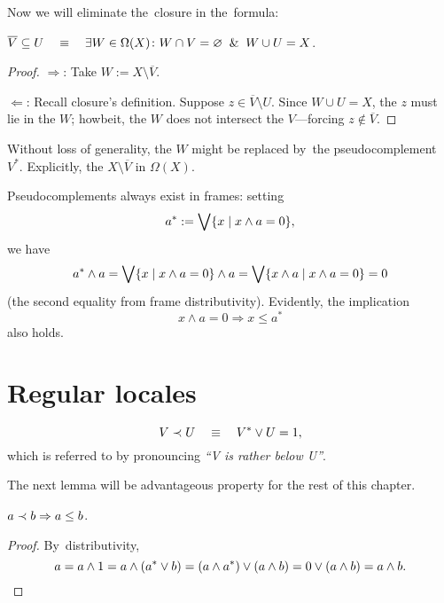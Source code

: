 Now we will eliminate the~closure in the~formula:

\begin{lem}
  $\overline{V}\subseteq U \quad \equiv \quad \exists W\in \Omega(X)\colon W \cap V =
  \varnothing \;\; \& \;\; W \cup U = X$.
\end{lem}
\begin{proof}
  $\Rightarrow$:
  Take $W := X\setminus \overline{V}$.

  $\Leftarrow$:
  Recall closure's definition.
  Suppose $z\in \overline{V}\setminus U$.
  Since $W \cup U = X$, the $z$ must lie in the $W$;
  howbeit, the $W$ does not intersect the $V$---forcing $z\not\in
  \overline{V}$.
\end{proof}

Without loss of generality, the $W$ might be replaced by~the
pseudocomplement~$V^*$.
Explicitly, the $X\setminus \overline{V}$ in $\Omega(X)$.%

\begin{note}
Pseudocomplements always exist in frames:
setting
\[
  a^* := \bigvee \{x \mid x \wedge a = 0\},
\]
we have
\[
  a^* \wedge a = \bigvee \{x \mid x \wedge a = 0\} \wedge a = \bigvee \{x \wedge
  a \mid x \wedge a = 0\} = 0
\]
(the second equality from frame distributivity).
Evidently, the implication
\[
  x \wedge a = 0 \Rightarrow x \le a^*
\]
also holds.
\end{note}

\section{Regular locales}

\begin{framed}
  \begin{nota}[$\rb$]
    \[
      V \prec U \quad \equiv \quad V^* \vee U = 1,
    \]
    which is referred to by pronouncing \emph{``V is rather below U''\/}.
  \end{nota}
\end{framed}

The next lemma will be advantageous property for the rest of this chapter.
\begin{lem} \label{rb->leq}
  $a \prec b \Rightarrow a \leq b$.
\end{lem}
\begin{proof}
  By~distributivity,
  \[
    a = a \wedge 1 = a \wedge (a^* \vee b) = (a \wedge a^*) \vee (a \wedge b) =
    0 \vee (a \wedge b) = a \wedge b. \qedhere
  \]
\end{proof}


